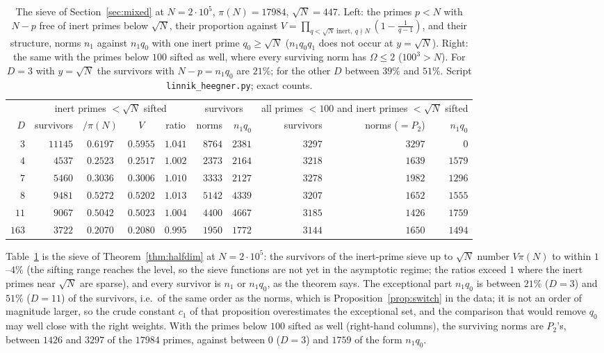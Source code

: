 \documentclass[11pt]{amsart}
\theoremstyle{definition}
\theoremstyle{remark}
\begin{document}
\begin{table}[htbp]
\centering\scriptsize\setlength{\tabcolsep}{4pt}
\begin{tabular}{r|rccc|rr|rrr}
\toprule
& \multicolumn{4}{c|}{inert primes $<\sqrt N$ sifted} & \multicolumn{2}{c|}{survivors} & \multicolumn{3}{c}{all primes $<100$ and inert primes $<\sqrt N$ sifted}\\
$D$ & survivors & $/\pi(N)$ & $V$ & ratio & norms & $n_1q_0$ & survivors & norms ($=P_2$) & $n_1q_0$\\
\midrule
$3$ & $11145$ & $0.6197$ & $0.5955$ & $1.041$ & $8764$ & $2381$ & $3297$ & $3297$ & $0$\\
$4$ & $4537$ & $0.2523$ & $0.2517$ & $1.002$ & $2373$ & $2164$ & $3218$ & $1639$ & $1579$\\
$7$ & $5460$ & $0.3036$ & $0.3006$ & $1.010$ & $3333$ & $2127$ & $3278$ & $1982$ & $1296$\\
$8$ & $9481$ & $0.5272$ & $0.5202$ & $1.013$ & $5142$ & $4339$ & $3207$ & $1652$ & $1555$\\
$11$ & $9067$ & $0.5042$ & $0.5023$ & $1.004$ & $4400$ & $4667$ & $3185$ & $1426$ & $1759$\\
$163$ & $3722$ & $0.2070$ & $0.2080$ & $0.995$ & $1950$ & $1772$ & $3144$ & $1650$ & $1494$\\
\bottomrule
\end{tabular}
\medskip
\caption{The sieve of Section~\ref{sec:mixed} at $N=2\cdot10^5$, $\pi(N)=17984$, $\sqrt N=447$. Left: the primes $p<N$ with $N-p$ free of inert primes below $\sqrt N$, their proportion against $V=\prod_{q<\sqrt N\ \mathrm{inert},\ q\nmid N}(1-\frac1{q-1})$, and their structure, norms $n_1$ against $n_1q_0$ with one inert prime $q_0\ge\sqrt N$ ($n_1q_0q_1$ does not occur at $y=\sqrt N$). Right: the same with the primes below $100$ sifted as well, where every surviving norm has $\Omega\le2$ ($100^3>N$). For $D=3$ with $y=\sqrt N$ the survivors with $N-p=n_1q_0$ are $21\%$; for the other $D$ between $39\%$ and $51\%$. Script \texttt{linnik\_heegner.py}; exact counts.}
\label{tab:sieve}
\end{table}

Table~\ref{tab:sieve} is the sieve of Theorem~\ref{thm:halfdim} at $N=2\cdot10^5$: the survivors of the inert-prime sieve up to $\sqrt N$ number $V\pi(N)$ to within $1$--$4\%$ (the sifting range reaches the level, so the sieve functions are not yet in the asymptotic regime; the ratios exceed $1$ where the inert primes near $\sqrt N$ are sparse), and every survivor is $n_1$ or $n_1q_0$, as the theorem says. The exceptional part $n_1q_0$ is between $21\%$ ($D=3$) and $51\%$ ($D=11$) of the survivors, i.e.\ of the same order as the norms, which is Proposition~\ref{prop:switch} in the data; it is not an order of magnitude larger, so the crude constant $c_1$ of that proposition overestimates the exceptional set, and the comparison that would remove $q_0$ may well close with the right weights. With the primes below $100$ sifted as well (right-hand columns), the surviving norms are $P_2$'s, between $1426$ and $3297$ of the $17984$ primes, against between $0$ ($D=3$) and $1759$ of the form $n_1q_0$.
\end{document}
